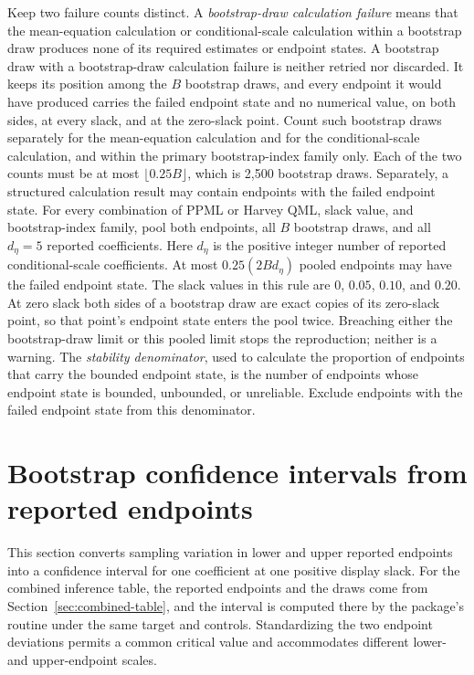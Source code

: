 \documentclass[11pt]{article}
\begin{document}
Keep two failure counts distinct. A \emph{bootstrap-draw calculation failure} means that the
mean-equation calculation or conditional-scale calculation within a bootstrap draw produces none of
its required estimates or endpoint states. A bootstrap draw with a bootstrap-draw
calculation failure is neither retried nor discarded. It keeps its position among the \(B\) bootstrap
draws, and every endpoint it would have produced carries the failed endpoint state and no numerical
value, on both sides, at every slack, and at the zero-slack point. Count such bootstrap draws
separately for the mean-equation calculation and for the conditional-scale calculation, and within
the primary bootstrap-index family only. Each of the two counts must be at most
\(\lfloor0.25B\rfloor\), which is 2,500 bootstrap draws. Separately, a structured calculation result may contain
endpoints with the failed endpoint state. For every combination of PPML or Harvey QML, slack value,
and bootstrap-index family, pool both endpoints, all \(B\) bootstrap draws, and all \(d_\eta=5\)
reported coefficients. Here \(d_\eta\) is the positive integer number of reported conditional-scale
coefficients. At most \(0.25(2Bd_\eta)\) pooled endpoints may have the failed endpoint
state. The slack values in this rule are \(0\), \(0.05\), \(0.10\), and \(0.20\). At zero slack both
sides of a bootstrap draw are exact copies of its zero-slack point, so that point's endpoint state
enters the pool twice. Breaching either the bootstrap-draw limit or this pooled limit stops the
reproduction; neither is a warning. The \emph{stability denominator}, used to calculate the proportion of endpoints that carry the
bounded endpoint state, is the number of endpoints whose endpoint state is bounded, unbounded, or
unreliable. Exclude
endpoints with the failed endpoint state from this denominator.

\section{Bootstrap confidence intervals from reported endpoints}
\label{sec:ci}

This section converts sampling variation in lower and upper reported endpoints into a
confidence interval for one coefficient at one positive display slack. For the combined inference
table, the reported endpoints and the draws come from Section~\ref{sec:combined-table}, and the
interval is computed there by the package's routine under the same target and controls. Standardizing the two endpoint
deviations permits a common critical value and accommodates different lower- and upper-endpoint
scales.
\end{document}
